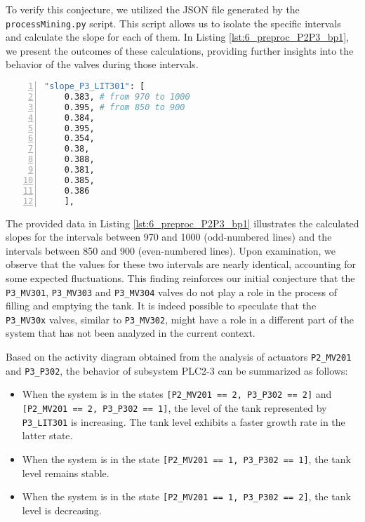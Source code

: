 To verify this conjecture, we utilized the JSON file generated by the \texttt{processMining.py} script. This script allows us to isolate the specific intervals and calculate the slope for each of them. In Listing \ref{lst:6_preproc_P2P3_bp1}, we present the outcomes of these calculations, providing further insights into the behavior of the valves during those intervals.

\begin{lstlisting}[language=bash, numbers=left, caption=Slope calculation of \texttt{P3\_LIT301} for the 850-900 and 970-1000 intervals related to tank levels, label=lst:6_preproc_P2P3_bp1]
	"slope_P3_LIT301": [
	0.383, # from 970 to 1000
	0.395, # from 850 to 900
	0.384,
	0.395,
	0.354,
	0.38,
	0.388,
	0.381,
	0.385,
	0.386
	],
\end{lstlisting}

The provided data in Listing \ref{lst:6_preproc_P2P3_bp1} illustrates the calculated slopes for the intervals between 970 and 1000 (odd-numbered lines) and the intervals between 850 and 900 (even-numbered lines). Upon examination, we observe that the values for these two intervals are nearly identical, accounting for some expected fluctuations. This finding reinforces our initial conjecture that the \texttt{P3\_MV301}, \texttt{P3\_MV303} and \texttt{P3\_MV304} valves do not play a role in the process of filling and emptying the tank. It is indeed possible to speculate that the \texttt{P3\_MV30x} valves, similar to \texttt{P3\_MV302}, might have a role in a different part of the system that has not been analyzed in the current context. 

\bigskip
Based on the activity diagram obtained from the analysis of actuators \texttt{P2\_MV201} and \texttt{P3\_P302}, the behavior of subsystem PLC2-3 can be summarized as follows:

\begin{itemize}
	\item When the system is in the states \texttt{[P2\_MV201 == 2, P3\_P302 == 2]} and \texttt{[P2\_MV201 == 2, P3\_P302 == 1]}, the level of the tank represented by \texttt{P3\_LIT301} is increasing. The tank level exhibits a faster growth rate in the latter state.
	
	\item When the system is in the state \texttt{[P2\_MV201 == 1, P3\_P302 == 1]}, the tank level remains stable.
	
	\item When the system is in the state \texttt{[P2\_MV201 == 1, P3\_P302 == 2]}, the tank level is decreasing.
\end{itemize}

